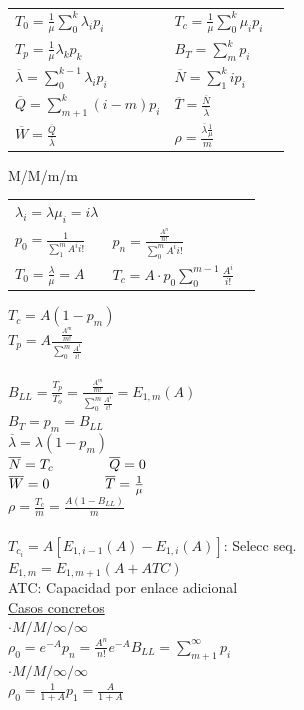 \vfill\null
\columnbreak
\begin{minipage}{.22\textwidth}
	\begin{tabular}{lp{3cm} l}
		$T_0=\frac{1}{\mu}\sum\limits_0^k{\lambda_{i}p_{i}}$         & $T_c=\frac{1}{\mu}\sum\limits_0^k{\mu_{i}p_{i}} $      \\
		$T_p=\frac{1}{\mu}{\lambda_{k}p_{k}}$                        & $B_T=\sum_{m}^{k}p_{i} $                               \\
		$\overline{\lambda}=\sum\limits_{0}^{k-1}{\lambda_{i}p_{i}}$ & $\overline{N}=\sum\limits_{1}^{k}{{i}p_{i}}$           \\
		$\overline{Q}=\sum\limits_{m+1}^{k}{(i-m)p_i}$               & $\overline{T}=\frac{\overline{N}}{\overline{\lambda}}$ \\
		$\overline{W}=\frac{\overline{Q}}{\overline{\lambda}}$       & $\rho=\frac{\overline{\lambda}{\frac{1}{\mu}}}{m}$     \\
	\end{tabular}
\end{minipage}

\begin{minipage}{.22\textwidth}
	M/M/m/m
	\begin{tabular}{lp{3cm} l}
		$\lambda_i=\lambda{\mu_i}=i{\lambda}$ &                                                    \\
		$p_0=\frac{1}{\sum_1^m{A^i}{i!}}$     & $p_n=\frac{\frac{A^n}{n!}}{\sum_0^m{A^i}{i!}}$     \\
		$T_0=\frac{\lambda}{\mu}=A$           & $T_c=A\cdot{p_0}\sum\limits_0^{m-1}\frac{A^i}{i!}$ \\
	\end{tabular}
	$T_c=A(1-p_m)$ \\
	$T_p=A\frac{\frac{A^m}{m!}}{\sum\limits_0^m{\frac{A^i}{i!}}}$ \\ \\
	$B_{LL}=\frac{T_p}{T_o} = \frac{\frac{A^m}{m!}}{\sum\limits_0^m{\frac{A^i}{i!}}} = E_{1,m}(A)$ \\
	$B_T = p_m = B_{LL}$ \\
	$\overline{\lambda} = \lambda{(1-p_m)}$ \\
	$\overline{N} = T_c \hskip 4em \overline{Q} = 0$             \\
	$\overline{W} = 0  \hskip 4em \overline{T} = \frac{1}{\mu}$ \\
	$\rho = \frac{T_c}{m}=\frac{A(1-B_{LL})}{m}$ \\ \\
	$T_{c_i} = A[E_{1,i-1}(A)-E_{1,i}(A)]$: Selecc seq. \\
	$E_{1,m} = E_{1,m+1}(A+ATC)$ \\
	ATC: Capacidad por enlace adicional \\
	{\underline{Casos concretos}} \\
	$\cdot M/M/\infty/\infty$ \\
	$\rho_0=e^{-A}p_n=\frac{A^n}{n!}e^{-A}B_{LL}=\sum\limits_{m+1}^{\infty}p_i$ \\
	$\cdot M/M/\infty/\infty$ \\
	$\rho_0 = \frac{1}{1+A}p_1=\frac{A}{1+A}$ \\
\end{minipage}

